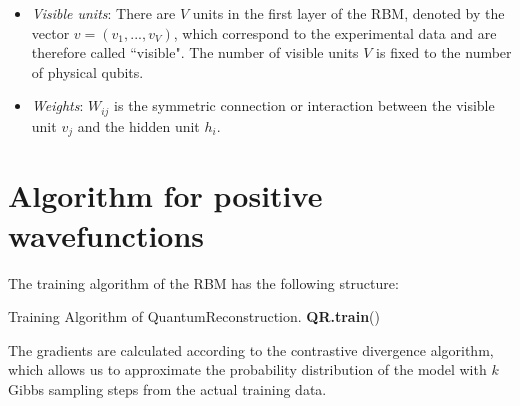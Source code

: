 \documentclass[submission, Phys, hidelinks]{SciPost}
\begin{document}
\begin{itemize}
\item {\it Visible units}: There are $V$ units in the first layer of the RBM, denoted by the vector $v=(v_1, ..., v_V)$, which correspond to the experimental data and are therefore called ``visible". The number of visible units $V$ is fixed to the number of physical qubits.

\item {\it Weights}: $W_{ij}$ is the symmetric connection or interaction between the visible unit $v_j$ and the hidden unit $h_i$.

\end{itemize}



\section{Algorithm for positive wavefunctions}
	The training algorithm of the RBM has the following structure:

	\begin{algorithm}[H]
		\caption{Training Algorithm of QuantumReconstruction. \textbf{QR.train}() }
		\SetAlgoLined
	\end{algorithm}


	The gradients are calculated according to the contrastive divergence algorithm, which allows us to approximate the probability distribution of the model with $k$ Gibbs sampling steps from the actual training data.
\end{document}
